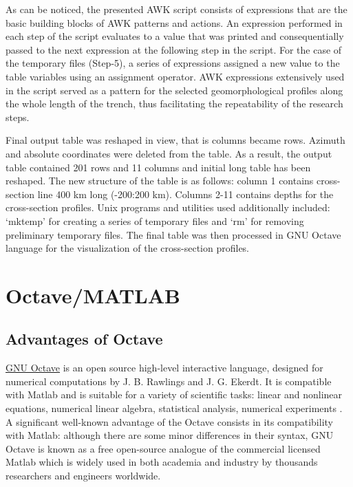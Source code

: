 \documentclass[11pt,a4paper]{report}
\begin{document}
{As can be noticed, the presented AWK script consists of expressions that are the basic building blocks of AWK patterns and actions. An expression performed in each step of the script evaluates to a value that was printed and consequentially passed to the next expression at the following step in the script. For the case of the temporary files (Step-5), a series of expressions assigned a new value to the table variables using an assignment operator. AWK expressions extensively used in the script served as a pattern for the selected geomorphological profiles along the whole length of the trench, thus facilitating the repeatability of the research steps.

Final output table was reshaped in view, that is columns became rows. Azimuth and absolute coordinates were deleted from the table. As a result, the output table contained 201 rows and 11 columns and initial long table has been reshaped. The new structure of the table is as follows: column 1 contains cross-section line 400 km long (-200:200 km). Columns 2-11 contains depths for the cross-section profiles. Unix programs and utilities used additionally included: ‘mktemp’ for creating a series of temporary files and ‘rm’ for removing preliminary temporary files. The final table was then processed in GNU Octave language for the visualization of the cross-section profiles. 

\pagebreak
\section{Octave/MATLAB}\label{ssec:Oct}

\subsection{Advantages of Octave}
\href{https://www.gnu.org/software/octave/}{GNU Octave} is an open source high-level interactive language, designed for numerical computations by J. B. Rawlings and J. G. Ekerdt. It is compatible with Matlab and is suitable for a variety of scientific tasks: linear and nonlinear equations, numerical linear algebra, statistical analysis, numerical experiments \cite{Eatonetal2019}. A significant well-known advantage of the Octave consists in its compatibility with Matlab: although there are some minor differences in their syntax, \ac{GNU} Octave is known as a free open-source analogue of the commercial licensed Matlab which is widely used in both academia and industry by thousands researchers and engineers worldwide. 

}
\end{document}
